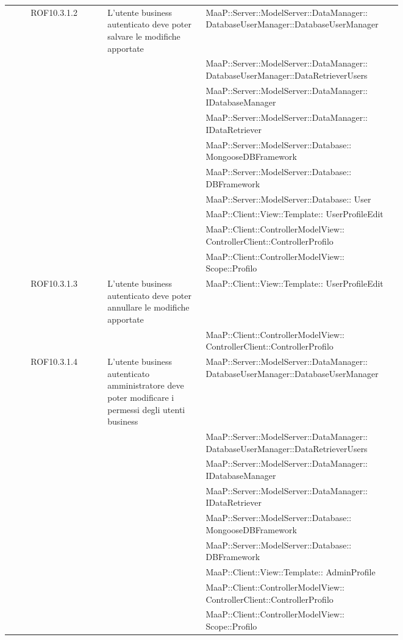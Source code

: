\begin{center}
\begin{longtable}{|c|p{0.25\linewidth}|p{0.5\linewidth}|}
\midrule
ROF10.3.1.2
& L'utente business autenticato deve poter  salvare le modifiche apportate
& MaaP::Server::ModelServer::DataManager:: DatabaseUserManager::DatabaseUserManager\\
& & MaaP::Server::ModelServer::DataManager:: DatabaseUserManager::DataRetrieverUsers\\
& & MaaP::Server::ModelServer::DataManager:: IDatabaseManager\\
& & MaaP::Server::ModelServer::DataManager:: IDataRetriever\\
& & MaaP::Server::ModelServer::Database:: MongooseDBFramework\\
& & MaaP::Server::ModelServer::Database:: DBFramework\\
& & MaaP::Server::ModelServer::Database:: User\\
& & MaaP::Client::View::Template:: UserProfileEdit\\
& & MaaP::Client::ControllerModelView:: ControllerClient::ControllerProfilo\\
& & MaaP::Client::ControllerModelView:: Scope::Profilo\\

\midrule
ROF10.3.1.3
& L'utente business autenticato deve poter annullare le modifiche apportate
& MaaP::Client::View::Template:: UserProfileEdit\\
& & MaaP::Client::ControllerModelView:: ControllerClient::ControllerProfilo\\

\midrule
ROF10.3.1.4
& L'utente business autenticato amministratore deve poter modificare i permessi degli utenti business
& MaaP::Server::ModelServer::DataManager:: DatabaseUserManager::DatabaseUserManager\\
& & MaaP::Server::ModelServer::DataManager:: DatabaseUserManager::DataRetrieverUsers\\
& & MaaP::Server::ModelServer::DataManager:: IDatabaseManager\\
& & MaaP::Server::ModelServer::DataManager:: IDataRetriever\\
& & MaaP::Server::ModelServer::Database:: MongooseDBFramework\\
& & MaaP::Server::ModelServer::Database:: DBFramework\\
& & MaaP::Client::View::Template:: AdminProfile\\
& & MaaP::Client::ControllerModelView:: ControllerClient::ControllerProfilo\\
& & MaaP::Client::ControllerModelView:: Scope::Profilo\\


\end{longtable}
\end{center}
